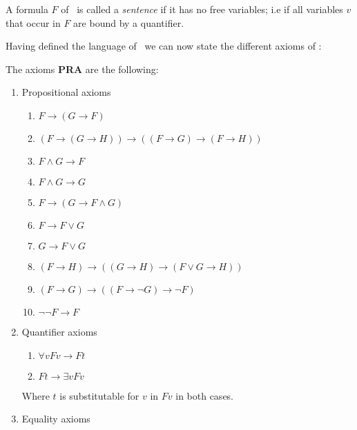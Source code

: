 \documentclass[../main.tex]{subfiles}
\begin{document}
\begin{defi}
	A formula $F$ of \PRA\ is called a \textit{sentence} if it has no free
	variables; i.e if all variables $v$ that occur in $F$ are bound by a
	quantifier.
\end{defi}

Having defined the language of \PRA\ we can now state the different axioms of
\PRA:
\begin{defi}
	The axioms \textbf{PRA} are the following:
	\begin{enumerate}
		\item Propositional axioms
			\begin{enumerate}
				\item
					$F\rightarrow( G\rightarrow F)$
				\item
					$(F\rightarrow( G\rightarrow H)
					)\rightarrow((F\rightarrow G)\rightarrow
					(F\rightarrow H))$
				\item $F\wedge G\rightarrow F$
				\item $F\wedge G\rightarrow G$
				\item $F\rightarrow
					( G\rightarrow F\wedge G)$
				\item $F\rightarrow F\vee G$
				\item $ G\rightarrow F\vee G$
				\item
					$(F\rightarrow H)\rightarrow(( G\rightarrow
					 H)\rightarrow(F\vee G\rightarrow H))$
				\item
					$(F\rightarrow
					G)\rightarrow((F\rightarrow\neg G)
					\rightarrow\neg F)$
				\item $\neg\neg F\rightarrow F$
			\end{enumerate}
		\item Quantifier axioms
			\begin{enumerate}
				\item $\forall vF v\rightarrow F t$
				\item $F t\rightarrow \exists v F
					v$
			\end{enumerate}
			Where $t$ is substitutable for $v$ in $F v$ in
			both cases.
		\item Equality axioms
\end{enumerate}
\end{defi}
\end{document}
